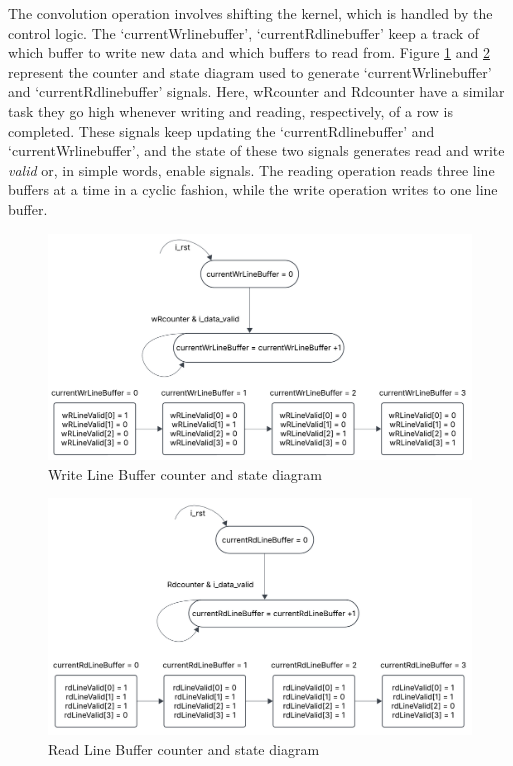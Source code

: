     \noindent
    The convolution operation involves shifting the kernel, which is handled by the control logic. The ‘currentWrlinebuffer’, ‘currentRdlinebuffer’ keep a track of which buffer to write new data and which buffers to read from. Figure \ref{fig:wrBufferControl} and \ref{fig:rDBufferControl} represent the counter and state diagram used to generate ‘currentWrlinebuffer’ and ‘currentRdlinebuffer’ signals.
    Here, wRcounter and Rdcounter have a similar task they go high whenever writing and reading, respectively, of a row is completed. These signals keep updating the ‘currentRdlinebuffer’ and ‘currentWrlinebuffer’, and the state of these two signals generates read and write \textit{valid} or, in simple words, enable signals. The reading operation reads three line buffers at a time in a cyclic fashion, while the write operation writes to one line buffer.

    \begin{figure}[H]
    \centering
    \includegraphics[width=0.75\linewidth]{images/convWrcontrol.png}
    \caption{Write Line Buffer counter and state diagram}
    \label{fig:wrBufferControl}
    \end{figure}

    \vspace{-1em}  %

    \begin{figure}[H]
    \centering
    \includegraphics[width=0.75\linewidth]{images/convRdcontrol.png}
    \caption{Read Line Buffer counter and state diagram}
    \label{fig:rDBufferControl}
    \end{figure}


